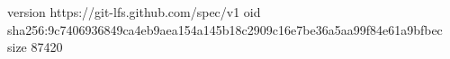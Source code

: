 version https://git-lfs.github.com/spec/v1
oid sha256:9c7406936849ca4eb9aea154a145b18c2909c16e7be36a5aa99f84e61a9bfbec
size 87420
